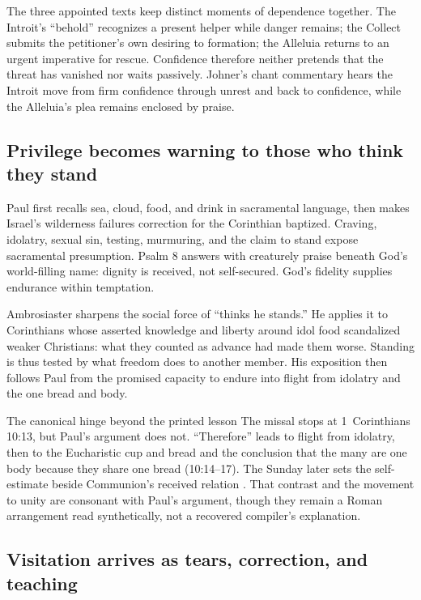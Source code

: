 \begin{deepstudy}
{The three appointed texts keep distinct moments of dependence together. The Introit's ``behold'' recognizes a present helper while danger remains; the Collect submits the petitioner's own desiring to formation; the Alleluia returns to an urgent imperative for rescue. Confidence therefore neither pretends that the threat has vanished nor waits passively. Johner's chant commentary hears the Introit move from firm confidence through unrest and back to confidence, while the Alleluia's plea remains enclosed by praise.

\subsection*{Privilege becomes warning to those who think they stand\enspace{}}

Paul first recalls sea, cloud, food, and drink in sacramental language, then makes Israel's wilderness failures correction for the Corinthian baptized. Craving, idolatry, sexual sin, testing, murmuring, and the claim to stand expose sacramental presumption. Psalm 8 answers with creaturely praise beneath God's world-filling name: dignity is received, not self-secured. God's fidelity supplies endurance within temptation.

Ambrosiaster sharpens the social force of ``thinks he stands.'' He applies it to Corinthians whose asserted knowledge and liberty around idol food scandalized weaker Christians: what they counted as advance had made them worse. Standing is thus tested by what freedom does to another member. His exposition then follows Paul from the promised capacity to endure into flight from idolatry and the one bread and body.

\begin{studybox}{The canonical hinge beyond the printed lesson}
The missal stops at 1~Corinthians 10:13, but Paul's argument does not. ``Therefore'' leads to flight from idolatry, then to the Eucharistic cup and bread and the conclusion that the many are one body because they share one bread (10:14--17). The Sunday later sets the self-estimate  beside Communion's received relation . That contrast and the movement to unity are consonant with Paul's argument, though they remain a Roman arrangement read synthetically, not a recovered compiler's explanation.
\end{studybox}

\newpage

\subsection*{Visitation arrives as tears, correction, and teaching\enspace{}}

}
\end{deepstudy}
